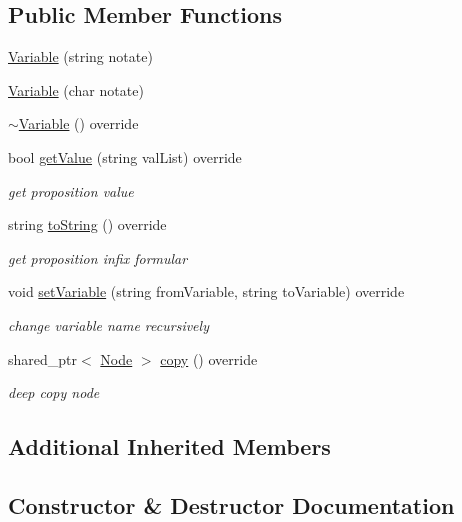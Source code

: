 \subsection*{Public Member Functions}
\begin{DoxyCompactItemize}
\item 
\hyperlink{class_variable_a98f05310666fc839abb59fd8599cf21c}{Variable} (string notate)
\item 
\hyperlink{class_variable_af836f63543807d77dfca8caacd54b1a5}{Variable} (char notate)
\item 
\hyperlink{class_variable_a0c619221ab7f65166baf4555c356d83c}{$\sim$\+Variable} () override
\item 
bool \hyperlink{class_variable_a2830553ab8b852a004c613a626fa6eb2}{get\+Value} (string val\+List) override
\begin{DoxyCompactList}\small\item\em get proposition value \end{DoxyCompactList}\item 
string \hyperlink{class_variable_a5b0b0e25200631521dc5bbc8df22acdc}{to\+String} () override
\begin{DoxyCompactList}\small\item\em get proposition infix formular \end{DoxyCompactList}\item 
void \hyperlink{class_variable_a6290fe9c9e63b4c0a980de1333902557}{set\+Variable} (string from\+Variable, string to\+Variable) override
\begin{DoxyCompactList}\small\item\em change variable name recursively \end{DoxyCompactList}\item 
shared\+\_\+ptr$<$ \hyperlink{class_node}{Node} $>$ \hyperlink{class_variable_af8d66ea58702db286b80632de320eafe}{copy} () override
\begin{DoxyCompactList}\small\item\em deep copy node \end{DoxyCompactList}\end{DoxyCompactItemize}
\subsection*{Additional Inherited Members}


\subsection{Constructor \& Destructor Documentation}
\mbox{\label{class_variable_a98f05310666fc839abb59fd8599cf21c}} 
